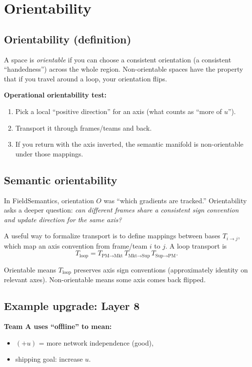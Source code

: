 \documentclass[11pt]{article}
\begin{document}
\section{Orientability}

\subsection{Orientability (definition)}

A space is \emph{orientable} if you can choose a consistent orientation (a consistent ``handedness'') across the whole region. Non-orientable spaces have the property that if you travel around a loop, your orientation flips.

\textbf{Operational orientability test:}
\begin{enumerate}[leftmargin=2em]
  \item Pick a local ``positive direction'' for an axis (what counts as ``more of $u$'').
  \item Transport it through frames/teams and back.
  \item If you return with the axis inverted, the semantic manifold is non-orientable under those mappings.
\end{enumerate}

\subsection{Semantic orientability}

In FieldSemantics, orientation $O$ was ``which gradients are tracked.'' Orientability asks a deeper question: \emph{can different frames share a consistent sign convention and update direction for the same axis?}

A useful way to formalize transport is to define mappings between bases $T_{i\rightarrow j}$, which map an axis convention from frame/team $i$ to $j$. A loop transport is
\[
  T_{\text{loop}} = T_{\text{PM}\rightarrow \text{Mkt}}\, T_{\text{Mkt}\rightarrow \text{Sup}}\, T_{\text{Sup}\rightarrow \text{PM}}.
\]

Orientable means $T_{\text{loop}}$ preserves axis sign conventions (approximately identity on relevant axes). Non-orientable means some axis comes back flipped.

\subsection{Example upgrade: Layer 8}

\textbf{Team A uses ``offline'' to mean:}
\begin{itemize}[leftmargin=2em]
  \item $(+u)$ = more network independence (good),
  \item shipping goal: increase $u$.
\end{itemize}
\end{document}
